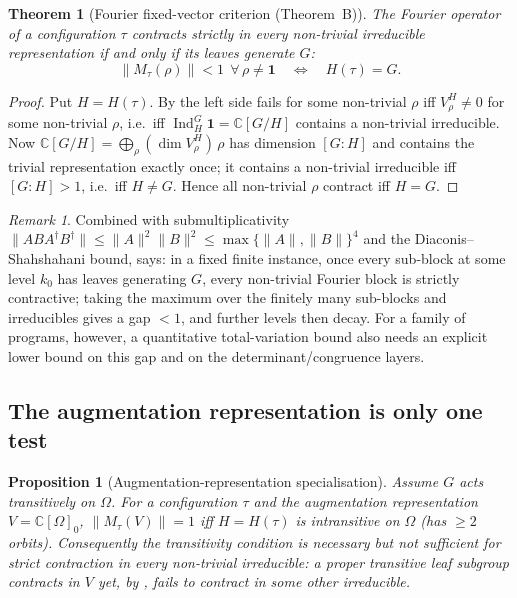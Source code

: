 \documentclass[11pt]{amsart}
\newtheorem{theorem}{Theorem}[section]
\newtheorem{proposition}[proposition]{Proposition}
\theoremstyle{definition}
\theoremstyle{remark}
\newtheorem{remark}[remark]{Remark}
\theoremstyle{plain}
\theoremstyle{plain}
\numberwithin{equation}{section}
\DeclareMathOperator{\Ind}{Ind}
\newcommand{\norm}[1]{\lVert #1 \rVert}
\newcommand{\opn}[1]{\norm{#1}}
\newcommand{\C}{\mathbb{C}}
\begin{document}
\begin{theorem}[Fourier fixed-vector criterion (Theorem~B)]
\label{thm:criterion}
The Fourier operator of a configuration $\tau$ contracts strictly in \emph{every}
non-trivial irreducible representation \emph{if and only if its leaves generate $G$}:
\[
\opn{M_\tau(\rho)}<1\ \ \forall\,\rho\neq\mathbf1
\quad\Longleftrightarrow\quad
H(\tau)=G .
\]
\end{theorem}

\begin{proof}
Put $H=H(\tau)$. By  the left side fails for some non-trivial $\rho$ iff $V_\rho^H\neq0$
for some non-trivial $\rho$, i.e.\ iff $\Ind_H^G\mathbf1=\C[G/H]$ contains a non-trivial
irreducible. Now $\C[G/H]=\bigoplus_\rho (\dim V_\rho^H)\,\rho$ has dimension $[G:H]$ and
contains the trivial representation exactly once; it contains a non-trivial irreducible
iff $[G:H]>1$, i.e.\ iff $H\neq G$. Hence all non-trivial $\rho$ contract iff $H=G$.
\end{proof}

\begin{remark}
Combined with submultiplicativity
$\opn{ABA^\dagger B^\dagger}\le\opn A^2\opn B^2\le\max\{\opn A,\opn B\}^4$ and
the Diaconis--Shahshahani bound,  says: in a fixed finite instance,
once every sub-block at some level $k_0$ has leaves generating $G$, every non-trivial
Fourier block is strictly contractive; taking the maximum over the finitely many
sub-blocks and irreducibles gives a gap $<1$, and further levels then decay. For a
family of programs, however, a quantitative total-variation bound also needs an explicit
lower bound on this gap and on the determinant/congruence layers.
\end{remark}

\subsection{The augmentation representation is only one test}

\begin{proposition}[Augmentation-representation specialisation]
\label{prop:std}
Assume $G$ acts transitively on $\Omega$. For a configuration $\tau$ and the
augmentation representation $V=\C[\Omega]_0$, $\opn{M_\tau(V)}=1$ iff
$H=H(\tau)$ is \emph{intransitive} on $\Omega$ (has $\ge2$ orbits). Consequently the
transitivity condition is \emph{necessary but not sufficient} for strict contraction
in every non-trivial irreducible: a proper
\emph{transitive} leaf subgroup contracts in $V$ yet, by , fails to
contract in some other irreducible.
\end{proposition}
\end{document}
